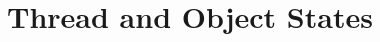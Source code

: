\hypertarget{group__legacy__state}{}\section{Thread and Object States}
\label{group__legacy__state}
